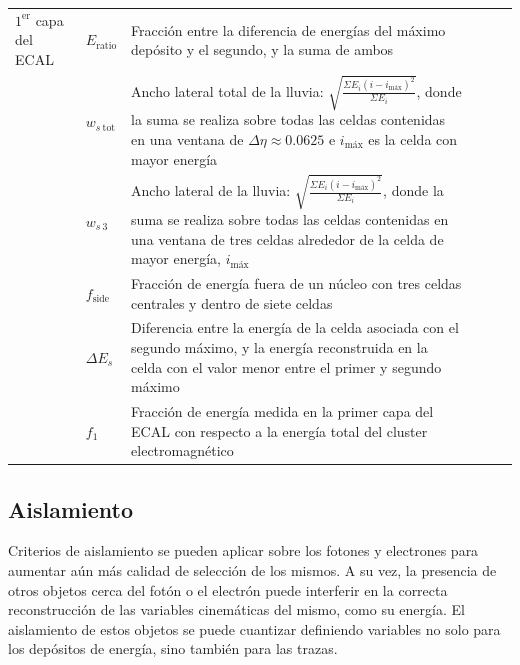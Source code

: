 \begin{table}
\begin{tabular}{ l p{2cm} p{8cm} c c c}
		\hline


		$1^{\text{er}}$ capa del ECAL & $E_{\text{ratio}}$ & Fracción entre la diferencia de energías del máximo depósito y el segundo, y la suma de ambos & \xmark & \cmark & \cmark \\

		 & $w_{s\:\text{tot}}$ & Ancho lateral total de la lluvia: $\sqrt{\frac{\Sigma E_{i}(i-i_{\text{máx}})^{2}}{\Sigma E_{i}}}$, donde la suma se realiza sobre todas las celdas contenidas en una ventana de $\Delta\eta\approx0.0625$ e $i_{\text{máx}}$ es la celda con mayor energía & \xmark & \xmark & \cmark \\

		 & $w_{s\:\text{3}}$ & Ancho lateral de la lluvia: $\sqrt{\frac{\Sigma E_{i}(i-i_{\text{máx}})^{2}}{\Sigma E_{i}}}$, donde la suma se realiza sobre todas las celdas contenidas en una ventana de tres celdas alrededor de la celda de mayor energía, $i_{\text{máx}}$ & \xmark & \xmark & \cmark \\

		 & $f_{\text{side}}$ & Fracción de energía fuera de un núcleo con tres celdas centrales y dentro de siete celdas & \xmark & \xmark & \cmark \\

		 & $\Delta E_{s}$ & Diferencia entre la energía de la celda asociada con el segundo máximo, y la energía reconstruida en la celda con el valor menor entre el primer y segundo máximo & \xmark & \xmark & \cmark \\

		 & $f_{\text{1}}$ & Fracción de energía medida en la primer capa del ECAL con respecto a la energía total del cluster electromagnético & \xmark & \xmark & \cmark \\


     \hline
     \hline

	\end{tabular}

\label{phIDVars}
\end{table}




\subsection{Aislamiento}
\label{isolation}


Criterios de aislamiento se pueden aplicar sobre los fotones y electrones para aumentar aún más calidad de selección de los mismos. A su vez, la presencia de otros objetos cerca del fotón o el electrón puede interferir en la correcta reconstrucción de las variables cinemáticas del mismo, como su energía. El aislamiento de estos objetos se puede cuantizar definiendo variables no solo para los depósitos de energía, sino también para las trazas.

